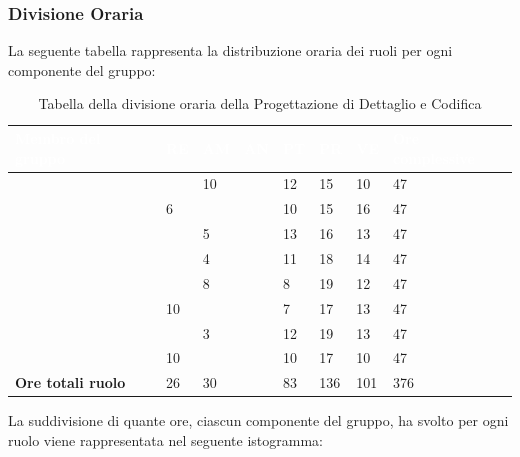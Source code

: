 \subsubsection{Divisione Oraria}
La seguente tabella rappresenta la distribuzione oraria dei ruoli per ogni componente del gruppo:
{
	\renewcommand{\arraystretch}{2}


	
\begin{longtable}[h]{ C{5cm} C{1cm} C{1cm} C{1cm} C{1cm} C{1cm} C{1cm} C{3cm}}
	\caption{Tabella della divisione oraria della Progettazione di Dettaglio e Codifica}\\
	\textcolor{white}{\textbf{Membro del gruppo}} & 
	\textcolor{white}{\textbf{RE}} & 
	\textcolor{white}{\textbf{AM}} & 
	\textcolor{white}{\textbf{AN}} & 
	\textcolor{white}{\textbf{PT}} & 
	\textcolor{white}{\textbf{PR}} & 
	\textcolor{white}{\textbf{VE}} & 
	\textcolor{white}{\textbf{Ore complessive}}\\
\endhead	
        
        \MC{} & & 10 & & 12 & 15 & 10 & 47\\
        \LD{} & 6 & & & 10 & 15 & 16 & 47\\
        \CE{} & & 5 & & 13 & 16 & 13 & 47 \\
        \SE{} & & 4 & & 11 & 18 & 14 & 47\\
        \PF{} & & 8 & & 8 & 19 & 12 & 47\\
        \DF{} & 10 & & & 7 & 17 & 13 & 47\\
        \BR{} & & 3 & & 12 & 19 & 13 & 47\\
       \AT{} & 10 & & & 10 & 17 & 10 & 47 \\
        \textbf{Ore totali ruolo} & 26 & 30 & & 83 & 136 & 101 & 376\\
		
	\end{longtable}

}

La suddivisione di quante ore, ciascun componente del gruppo, ha svolto per ogni ruolo viene rappresentata nel seguente istogramma:



